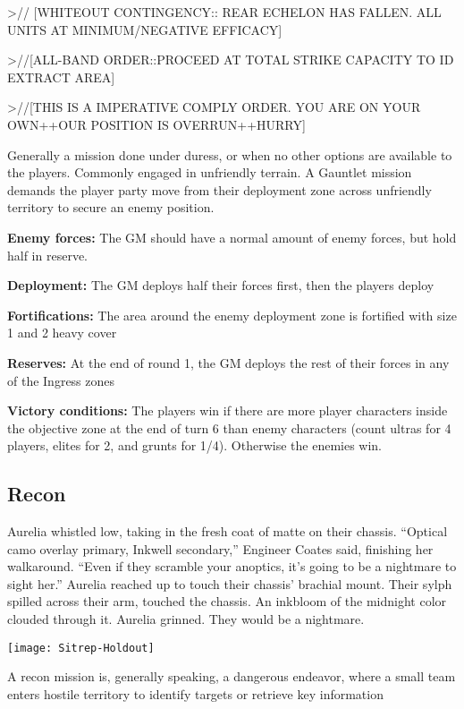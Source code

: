 >// [WHITEOUT CONTINGENCY:: REAR ECHELON HAS FALLEN. ALL UNITS AT
MINIMUM/NEGATIVE EFFICACY]

>//[ALL-BAND ORDER::PROCEED AT TOTAL STRIKE CAPACITY TO ID EXTRACT AREA]

>//[THIS IS A IMPERATIVE COMPLY ORDER. YOU ARE ON YOUR OWN++OUR POSITION IS
OVERRUN++HURRY]

Generally a mission done under duress, or when no other options are available to the players. Commonly engaged in unfriendly terrain. A Gauntlet mission demands the player party move from their deployment zone across unfriendly territory to secure an enemy position.

\textbf{Enemy forces:} The GM should have a normal amount of enemy forces, but hold half in reserve.

\textbf{Deployment:} The GM deploys half their forces first, then the players deploy

\textbf{Fortifications:} The area around the enemy deployment zone is fortified with size 1 and 2 heavy cover

\textbf{Reserves:} At the end of round 1, the GM deploys the rest of their forces in any of the Ingress zones

\textbf{Victory conditions:} The players win if there are more player characters inside the objective zone at the end of turn 6 than enemy characters (count ultras for 4 players, elites for 2, and grunts for 1/4). Otherwise the enemies win. 

 \newpage
 \subsection{Recon}
 Aurelia whistled low, taking in the fresh coat of matte on their chassis. “Optical camo overlay primary, Inkwell secondary,” Engineer Coates said, finishing her walkaround. “Even if they scramble your anoptics, it’s going to be a nightmare to sight her.” Aurelia reached up to touch their chassis’ brachial mount. Their sylph spilled across their arm, touched the chassis. An inkbloom of the midnight color clouded through it. Aurelia grinned. They would be a nightmare.
 
 \begin{center}
   \texttt{[image: Sitrep-Holdout]}
 \end{center}

 A recon mission is, generally speaking, a dangerous endeavor, where a small team enters hostile territory to identify targets or retrieve key information

